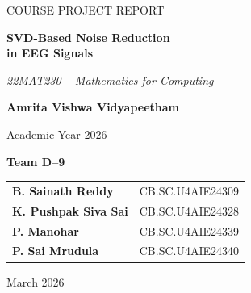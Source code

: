 \documentclass[17pt,a4paper]{extarticle}
\begin{document}


\begin{titlepage}


\centering

\vspace*{2cm}

{\Large \textcolor{gray!70}{COURSE PROJECT REPORT}}

\vspace{1.5cm}

{\fontsize{30}{34}\selectfont
\textbf{\textcolor{blue!70!black}{SVD-Based Noise Reduction}}\\[0.3cm]
\textbf{\textcolor{blue!70!black}{in EEG Signals}}
}

\vspace{1.2cm}

{\large \textit{22MAT230 – Mathematics for Computing}}

\vspace{2cm}

{\Large \textbf{\textcolor{blue!80!black}{Amrita Vishwa Vidyapeetham}}}

\vspace{0.2cm}


{\large Academic Year 2026}

\vspace{1.8cm}

{\large \textbf{\textcolor{red!70!black}{Team D–9}}}

\vspace{0.8cm}

\renewcommand{\arraystretch}{1.5}
\begin{tabular}{ll}
\textbf{B. Sainath Reddy} & CB.SC.U4AIE24309 \\
\textbf{K. Pushpak Siva Sai} & CB.SC.U4AIE24328 \\
\textbf{P. Manohar} & CB.SC.U4AIE24339 \\
\textbf{P. Sai Mrudula} & CB.SC.U4AIE24340 \\
\end{tabular}

\vspace{0.5cm}

{\large March 2026}

\end{titlepage}
\end{document}
